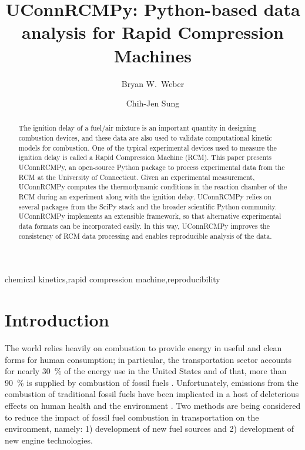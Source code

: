 \documentclass[12pt]{../ussci}
\title{ UConnRCMPy: Python-based data analysis for Rapid Compression Machines }
\author[1*]{Bryan W.\ Weber}
\author[1]{Chih-Jen Sung}
\affil[1]{Department of Mechanical Engineering, University of Connecticut, Storrs,
CT, USA}
\affil[*]{Corresponding Author: \email{bryan.weber@uconn.edu}}
\begin{document}
\maketitle

\begin{abstract} %
    The ignition delay of a fuel/air mixture is an important quantity in
    designing combustion devices, and these data are also used to validate
    computational kinetic models for combustion. One of the typical
    experimental devices used to measure the ignition delay is called a
    Rapid Compression Machine (RCM). This paper presents UConnRCMPy, an
    open-source Python package to process experimental data from the RCM at
    the University of Connecticut. Given an experimental measurement,
    UConnRCMPy computes the thermodynamic conditions in the reaction chamber
    of the RCM during an experiment along with the ignition delay.
    UConnRCMPy relies on several packages from the SciPy stack and the
    broader scientific Python community. UConnRCMPy implements an extensible
    framework, so that alternative experimental data formats can be
    incorporated easily. In this way, UConnRCMPy improves the consistency of
    RCM data processing and enables reproducible analysis of the data.
\end{abstract}

\begin{keyword}
    chemical kinetics\sep rapid compression machine\sep reproducibility
\end{keyword}

\section{Introduction}\label{introduction}

The world relies heavily on combustion to provide energy in useful and
clean forms for human consumption; in particular, the transportation
sector accounts for nearly \SI{30}{\percent} of the energy use in the United States
and of that, more than \SI{90}{\percent} is supplied by combustion of fossil fuels
\autocite{MER2016}. Unfortunately, emissions from the combustion of
traditional fossil fuels have been implicated in a host of deleterious
effects on human health and the environment \autocite{Avakian2002}. Two
methods are being considered to reduce the impact of fossil fuel
combustion in transportation on the environment, namely: 1) development
of new fuel sources and 2) development of new engine technologies.
\end{document}
